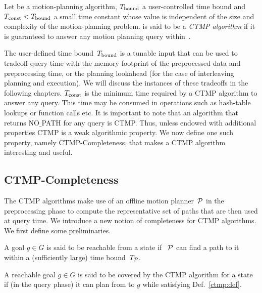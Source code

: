 \documentclass[a4paper]{report}
\begin{document}
\begin{definition}
\label{ctmp:def}
Let  be a motion-planning algorithm,
$T_{\textrm{bound}}$ a user-controlled time bound
and
$T_{\textrm{const}} < T_{\textrm{bound}}$ a small time constant whose value is independent of the size and complexity of the motion-planning problem.
%
 is said to be a \emph{CTMP algorithm} if it is guaranteed to answer any motion planning query within~\Tbound.
\end{definition}

The user-defined time bound~$T_{\textrm{bound}}$ is a tunable input that can be used to tradeoff query time with the memory footprint of the preprocessed data and preprocessing time, or the planning lookahead (for the case of interleaving planning and execution). We will discuss the instances of these tradeoffs in the following chapters.
%
$T_{\textrm{const}}$ is the minimum time required by a CTMP algorithm to answer any query. This time may be consumed in operations such as hash-table lookups or function calls etc.
%
It is important to note that an algorithm that returns NO$\_$PATH for any query is CTMP. Thus, unless endowed with additional properties CTMP is a weak algorithmic property.
We now define one such property, namely CTMP-Completeness, that makes a CTMP algorithm interesting and useful.

\subsection{CTMP-Completeness}
The CTMP algorithms make use of an offline motion planner~$\mathcal{P}$ in the preprocessing phase to compute the representative set of paths that are then used at query time. We introduce a new notion of completeness for CTMP algorithms. We first define some preliminaries. 

\vspace{2mm}
\begin{definition}[Reachability]
\label{def:reachable}
A goal $g \in G$ is said to be reachable from a state \Sstart if~$~\mathcal{P}$ can find a path to it within a (sufficiently large) time bound~$T_\textrm{\ensuremath{\mathcal{P}}}$. 
\end{definition}

\vspace{2mm}
\begin{definition}[Coverage]
\label{def:covered}
    A reachable goal $g \in G$ is said to be covered by the CTMP algorithm for a state \Sstart if (in the query phase) it can plan from \Sstart to $g$ while satisfying Def.~\ref{ctmp:def}.
\end{definition}
\end{document}

